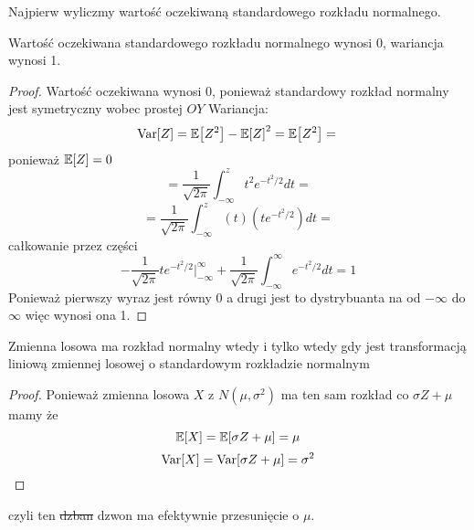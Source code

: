 Najpierw wyliczmy wartość oczekiwaną standardowego rozkładu normalnego.
\begin{theorem}
	Wartość oczekiwana standardowego rozkładu normalnego wynosi 0, wariancja wynosi 1.
\end{theorem}

\begin{proof}
	Wartość oczekiwana wynosi 0, ponieważ standardowy rozkład normalny jest symetryczny wobec prostej \( OY\)
	Wariancja:
	\[
		\variance{Z} = \expected{Z^2} - \expected{Z}^2 = \expected{Z^2} = \\
	\]
	ponieważ \( \expected{Z} = 0 \)
	\[
		= \frac{1}{\sqrt{2\pi}}\int_{-\infty}^{z}t^2e^{-t^2/2} dt =
	\]
	\[
		= \frac{1}{\sqrt{2\pi}}\int_{-\infty}^{z}(t)(te^{-t^2/2}) dt =
	\]
	całkowanie przez części
	\[
		-\frac{1}{\sqrt{2\pi}}te^{-t^2/2}|_{-\infty}^{\infty} + \frac{1}{\sqrt{2\pi}}\int_{-\infty}^{\infty}e^{-t^2/2} dt = 1
	\]
	Ponieważ pierwszy wyraz jest równy 0 a drugi jest to dystrybuanta na od \(-\infty \) do \( \infty \) więc wynosi ona 1.
\end{proof}

\begin{lemma}
	Zmienna losowa ma rozkład normalny wtedy i tylko wtedy gdy jest transformacją liniową zmiennej losowej o standardowym rozkładzie normalnym
\end{lemma}

\begin{proof}
	Ponieważ zmienna losowa \( X\) z \(N(\mu, \sigma^2) \) ma ten sam rozkład co \( \sigma Z + \mu \) mamy że
	\[\expected{X} = \expected{\sigma Z + \mu} = \mu
	\]
	\[
		\variance{X} = \variance{\sigma Z + \mu} = \sigma^2
	\]
\end{proof}
czyli ten \sout{dzban} dzwon ma efektywnie przesunięcie o \( \mu \).